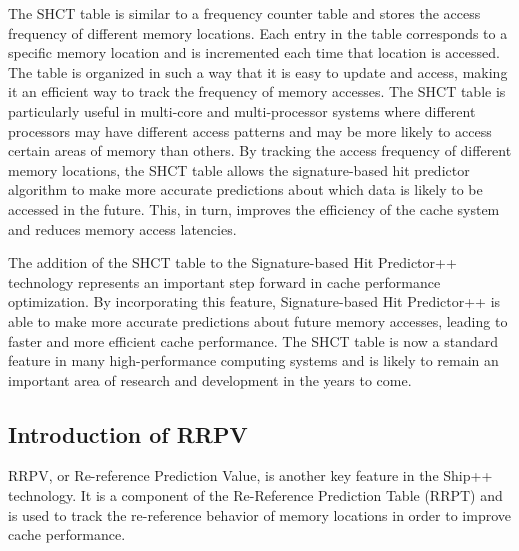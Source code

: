 The SHCT table is similar to a frequency counter table and stores the access frequency of different memory locations. Each entry in the table corresponds to a specific memory location and is incremented each time that location is accessed. The table is organized in such a way that it is easy to update and access, making it an efficient way to track the frequency of memory accesses.\cite{Jiang} The SHCT table is particularly useful in multi-core and multi-processor systems where different processors may have different access patterns and may be more likely to access certain areas of memory than others. By tracking the access frequency of different memory locations, the SHCT table allows the signature-based hit predictor algorithm to make more accurate predictions about which data is likely to be accessed in the future. This, in turn, improves the efficiency of the cache system and reduces memory access latencies.

The addition of the SHCT table to the Signature-based Hit Predictor++ technology represents an important step forward in cache performance optimization. By incorporating this feature, Signature-based Hit Predictor++ is able to make more accurate predictions about future memory accesses, leading to faster and more efficient cache performance. The SHCT table is now a standard feature in many high-performance computing systems and is likely to remain an important area of research and development in the years to come.

\subsection{Introduction of RRPV}
RRPV, or Re-reference Prediction Value, is another key feature in the Ship++ technology. It is a component of the Re-Reference Prediction Table (RRPT) and is used to track the re-reference behavior of memory locations in order to improve cache performance.\cite{Liu}

